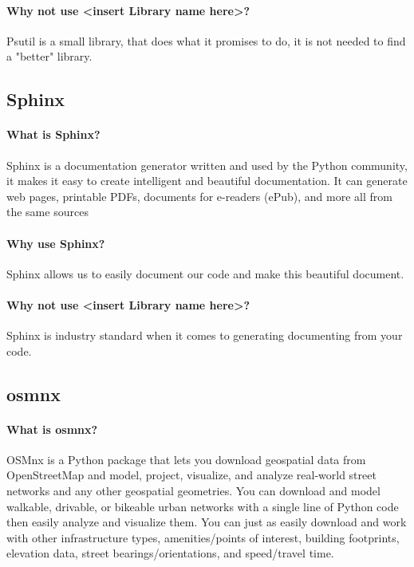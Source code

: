 \documentclass[parskip=full]{report} %
\begin{document}
\paragraph{Why not use <insert Library name here>?}
Psutil is a small  library, that does what it promises to do, it is not needed to find a "better" library.

\subsection{Sphinx}

\paragraph{What is Sphinx?}
Sphinx is a documentation generator written and used by the Python community, it makes it easy to create intelligent and beautiful documentation.
It can generate web pages, printable PDFs, documents for e-readers (ePub), and more all from the same sources

\paragraph{Why use Sphinx?}
Sphinx allows us to easily document our code and make this beautiful document.

\paragraph{Why not use <insert Library name here>?}
Sphinx is industry standard when it comes to generating documenting from your code.

\subsection{osmnx}

\paragraph{What is osmnx?}
OSMnx is a Python package that lets you download geospatial data from OpenStreetMap and model, project, visualize, and analyze real-world street networks and any other geospatial geometries. You can download and model walkable, drivable, or bikeable urban networks with a single line of Python code then easily analyze and visualize them. You can just as easily download and work with other infrastructure types, amenities/points of interest, building footprints, elevation data, street bearings/orientations, and speed/travel time.
\end{document}
